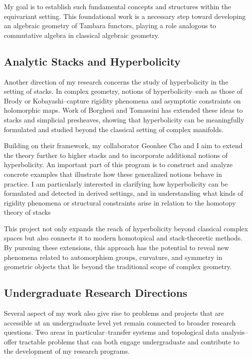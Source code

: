 \documentclass[11pt]{article}
\begin{document}
My goal is to establish such fundamental concepts and structures within the equivariant setting.
This foundational work is a necessary step toward developing an algebraic geometry of Tambara functors, playing a role analogous to commutative algebra in classical algebraic geometry.


\subsection*{Analytic Stacks and Hyperbolicity}
Another direction of my research concerns the study of hyperbolicity in the setting of stacks.
In complex geometry, notions of hyperbolicity--such as those of Brody or Kobayashi--capture rigidity phenomena and asymptotic constraints on holomorphic maps.
Work of Borghesi and Tomassini \cite{MR3673667} has extended these ideas to stacks and simplicial presheaves, showing that hyperbolicity can be meaningfully formulated and studied beyond the classical setting of complex manifolds.

Building on their framework, my collaborator Geonhee Cho and I aim to extend the theory further to higher stacks and to incorporate additional notions of hyperbolicity.
An important part of this program is to construct and analyze concrete examples that illustrate how these generalized notions behave in practice.
I am particularly interested in clarifying how hyperbolicity can be formulated and detected in derived settings, and in understanding what kinds of rigidity phenomena or structural constraints arise in relation to the homotopy theory of stacks

This project not only expands the reach of hyperbolicity beyond classical complex spaces but also connects it to modern homotopical and stack-theoretic methods. By pursuing these extensions, this approach has the potential to reveal new phenomena related to automorphism groups, curvature, and symmetry in geometric objects that lie beyond the traditional scope of complex geometry.


\subsection*{Undergraduate Research Directions}
Several aspect of my work also give rise to problems and projects that are accessible at an undergraduate level yet remain connected to broader research questions.
Two areas in particular--transfer systems and topological data analysis--offer tractable problems that can both engage undergraduate and contribute to the development of my research programs.
\end{document}
